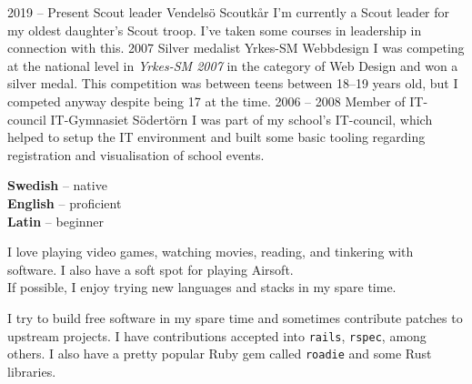 \documentclass[9pt]{developercv} %
\begin{document}


\begin{entrylist}
  \entry
    {2019 -- Present}
    {Scout leader}
    {Vendelsö Scoutkår}
    {I'm currently a Scout leader for my oldest daughter's Scout troop. I've
      taken some courses in leadership in connection with this.}
  \entry
    {2007}
    {Silver medalist}
    {Yrkes-SM Webbdesign}
    {I was competing at the national level in \textit{Yrkes-SM 2007} in the
      category of Web Design and won a silver medal. This competition was
      between teens between 18--19 years old, but I competed anyway despite
      being 17 at the time.}
  \entry
    {2006 -- 2008}
    {Member of IT-council}
    {IT-Gymnasiet Södertörn}
    {I was part of my school's IT-council, which helped to setup the IT
      environment and built some basic tooling regarding registration and
      visualisation of school events.}
\end{entrylist}


\begin{minipage}[t]{0.3\textwidth}
  \vspace{-\baselineskip} %


  \textbf{Swedish} -- native\\
  \textbf{English} -- proficient\\
  \textbf{Latin} -- beginner
\end{minipage}
\hfill
\begin{minipage}[t]{0.3\textwidth}
  \vspace{-\baselineskip} %


  I love playing video games, watching movies, reading, and tinkering with
  software. I also have a soft spot for playing Airsoft.\\ If possible, I enjoy
  trying new languages and stacks in my spare time.
\end{minipage}
\hfill
\begin{minipage}[t]{0.3\textwidth}
  \vspace{-\baselineskip} %


  I try to build free software in my spare time and sometimes contribute
  patches to upstream projects. I have contributions accepted into
  \texttt{rails}, \texttt{rspec}, among others. I also have a pretty popular
  Ruby gem called \texttt{roadie} and some Rust libraries.
\end{minipage}
\end{document}
